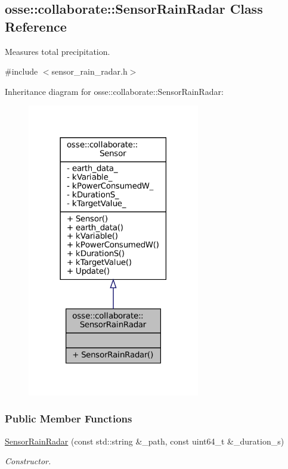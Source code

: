 \hypertarget{classosse_1_1collaborate_1_1_sensor_rain_radar}{}\subsection{osse\+:\+:collaborate\+:\+:Sensor\+Rain\+Radar Class Reference}
\label{classosse_1_1collaborate_1_1_sensor_rain_radar}


Measures total precipitation.  




{\ttfamily \#include $<$sensor\+\_\+rain\+\_\+radar.\+h$>$}



Inheritance diagram for osse\+:\+:collaborate\+:\+:Sensor\+Rain\+Radar\+:
\nopagebreak
\begin{figure}[H]
\begin{center}
\leavevmode
\includegraphics[width=213pt]{classosse_1_1collaborate_1_1_sensor_rain_radar__inherit__graph}
\end{center}
\end{figure}
\subsubsection*{Public Member Functions}
\begin{DoxyCompactItemize}
\item 
\hyperlink{classosse_1_1collaborate_1_1_sensor_rain_radar_af454a12a4cfea3b84b9c0901c9088e2d}{Sensor\+Rain\+Radar} (const std\+::string \&\+\_\+path, const uint64\+\_\+t \&\+\_\+duration\+\_\+s)
\begin{DoxyCompactList}\small\item\em Constructor. \end{DoxyCompactList}\end{DoxyCompactItemize}


